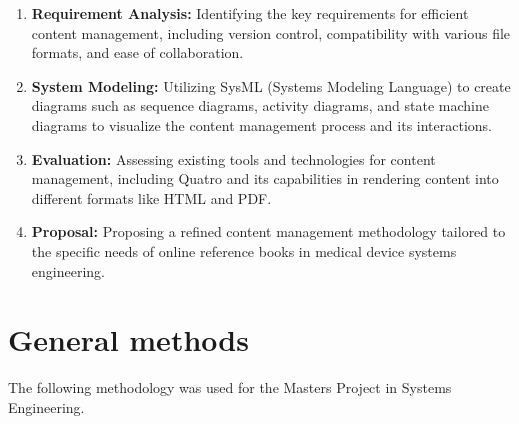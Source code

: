 \documentclass[
  letterpaper,
  DIV=11,
  numbers=noendperiod]{scrreprt}
\providecommand{\tightlist}{%
  \setlength{\itemsep}{0pt}\setlength{\parskip}{0pt}}\usepackage{longtable,booktabs,array}
\begin{document}
\begin{enumerate}
\def\labelenumi{\arabic{enumi}.}
\tightlist
\item
  \textbf{Requirement Analysis:} Identifying the key requirements for
  efficient content management, including version control, compatibility
  with various file formats, and ease of collaboration.
\item
  \textbf{System Modeling:} Utilizing SysML (Systems Modeling Language)
  to create diagrams such as sequence diagrams, activity diagrams, and
  state machine diagrams to visualize the content management process and
  its interactions.
\item
  \textbf{Evaluation:} Assessing existing tools and technologies for
  content management, including Quatro and its capabilities in rendering
  content into different formats like HTML and PDF.
\item
  \textbf{Proposal:} Proposing a refined content management methodology
  tailored to the specific needs of online reference books in medical
  device systems engineering.
\end{enumerate}

\section{General methods}\label{general-methods}

The following methodology was used for the Masters Project in Systems
Engineering.
\end{document}
